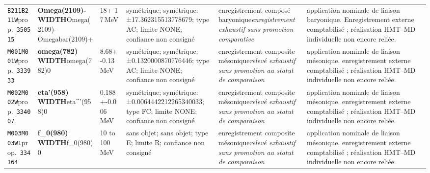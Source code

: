 \begin{landscape}
\begin{longtable}{L{1.85cm}L{4.45cm}L{2.35cm}L{4.05cm}L{3.35cm}L{7.15cm}}
\texttt{B211}\newline \texttt{B211W}\newline prop.\ \texttt{350515} & \textbf{Omega(2109)- WIDTH}\newline Omega(2109)- \textbar{}\allowbreak{} Omegabar(2109)+ & 18+-17\,MeV & symétrique; symétrique: ±17.362315513778679; type AC; limite NONE; confiance non consigné & enregistrement composé baryonique\newline \emph{enregistrement exhaustif sans promotion comparative} & application nominale de liaison baryonique. Enregistrement externe comptabilisé ; réalisation HMT--MD individuelle non encore reliée. \\
\texttt{M001}\newline \texttt{M001W}\newline prop.\ \texttt{333933} & \textbf{omega(782) WIDTH}\newline omega(782)0 & 8.68+-0.13\,MeV & symétrique; symétrique: ±0.1320000870776446; type AC; limite NONE; confiance non consigné & enregistrement composite mésonique\newline \emph{relevé exhaustif sans promotion au statut de comparaison} & application nominale de liaison mésonique. enregistrement externe comptabilisé ; réalisation HMT--MD individuelle non encore reliée. \\
\texttt{M002}\newline \texttt{M002W}\newline prop.\ \texttt{334007} & \textbf{eta'(958) WIDTH}\newline eta\textasciicircum{}'(958)0 & 0.188+-0.006\,MeV & symétrique; symétrique: ±0.0064442212265340033; type FC; limite NONE; confiance non consigné & enregistrement composite mésonique\newline \emph{relevé exhaustif sans promotion au statut de comparaison} & application nominale de liaison mésonique. enregistrement externe comptabilisé ; réalisation HMT--MD individuelle non encore reliée. \\
\texttt{M003}\newline \texttt{M003W1}\newline prop.\ \texttt{334164} & \textbf{f\_\allowbreak{}0(980) WIDTH}\newline f\_\allowbreak{}0(980)0 & 10 to 100\,MeV & sans objet; sans objet; type E; limite R; confiance non consigné & enregistrement composite mésonique\newline \emph{relevé exhaustif sans promotion au statut de comparaison} & application nominale de liaison mésonique. enregistrement externe comptabilisé ; réalisation HMT--MD individuelle non encore reliée. \\

\end{longtable}
\end{landscape}
